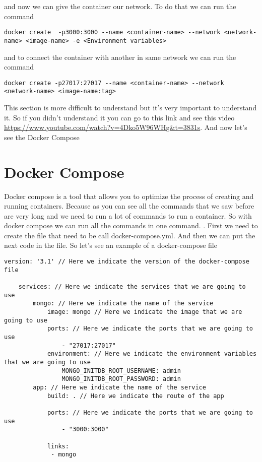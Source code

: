 \documentclass{article}
\begin{document}
and now we can give the container our network. To do that we can run the command
\begin{lstlisting}[breaklines=true, breakatwhitespace=true]
    docker create  -p3000:3000 --name <container-name> --network <network-name> <image-name> -e <Environment variables>
\end{lstlisting}

and to connect the container with another in same network we can run the command
\begin{lstlisting}[breaklines=true, breakatwhitespace=true]
    docker create -p27017:27017 --name <container-name> --network <network-name> <image-name:tag>
\end{lstlisting}

This section is more difficult to understand but it's very important to understand it. So if you didn't understand it you 
can go to this link and see this video \url{https://www.youtube.com/watch?v=4Dko5W96WHg&t=3831s}. And now let's see the Docker 
Compose 

\section*{Docker Compose}
Docker compose is a tool that allows you to optimize the process of creating and running containers. Because as you can see 
all the commands that we saw before are very long and we need to run a lot of commands to run a container. So with docker compose
we can run all the commands in one command. . First we need to create the file that need to be call docker-compose.yml.
 And then we can put the next code in the file. So let's see an example of a docker-compose file
\begin{lstlisting}[breaklines=true, breakatwhitespace=true]
    version: '3.1' // Here we indicate the version of the docker-compose file

    services: // Here we indicate the services that we are going to use
        mongo: // Here we indicate the name of the service
            image: mongo // Here we indicate the image that we are going to use
            ports: // Here we indicate the ports that we are going to use
                - "27017:27017"
            environment: // Here we indicate the environment variables that we are going to use
                MONGO_INITDB_ROOT_USERNAME: admin
                MONGO_INITDB_ROOT_PASSWORD: admin
        app: // Here we indicate the name of the service
            build: . // Here we indicate the route of the app 

            ports: // Here we indicate the ports that we are going to use
                - "3000:3000"
            
            links: 
             - mongo
        
\end{lstlisting}
\end{document}
